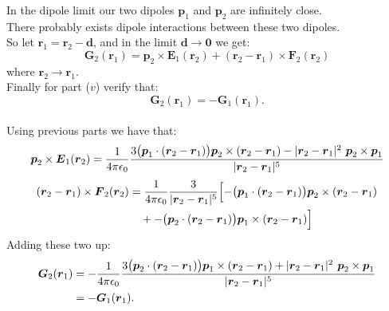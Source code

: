 \begin{enumerate}
    In the dipole limit
    our two dipoles $\boldsymbol{p}_1$ and $\boldsymbol{p}_2$
    are infinitely close. \\
    There probably exists dipole interactions between these two dipoles. \\
    So let $\boldsymbol{r}_1=\boldsymbol{r}_2-\boldsymbol{d}$,
    and in the limit $\boldsymbol{d}\rightarrow\boldsymbol{0}$ we get:
    $$\boldsymbol{G}_2(\boldsymbol{r}_1)
    =\boldsymbol{p}_2\times\boldsymbol{E}_1(\boldsymbol{r}_2)
    +(\boldsymbol{r}_2-\boldsymbol{r}_1)
    \times\boldsymbol{F}_2(\boldsymbol{r}_2)$$
    where $\boldsymbol{r}_2\rightarrow\boldsymbol{r}_1$. \\

    Finally for part ($v$) verify that:
    $$\boldsymbol{G}_2(\boldsymbol{r}_1)
    =-\boldsymbol{G}_1(\boldsymbol{r}_1).$$ \\

    Using previous parts we have that:
    $$\boldsymbol{p}_2\times\boldsymbol{E}_1(\boldsymbol{r}_2)
    =\frac{1}{4\pi\epsilon_0}
    \frac{3\bigl(\boldsymbol{p}_1
    \cdot(\boldsymbol{r}_2-\boldsymbol{r}_1)\bigr)
    \boldsymbol{p}_2\times
    (\boldsymbol{r}_2-\boldsymbol{r}_1)
    -|\boldsymbol{r}_2-\boldsymbol{r}_1|^2
    \hspace{0.05in}\boldsymbol{p}_2\times\boldsymbol{p}_1}
    {|\boldsymbol{r}_2-\boldsymbol{r}_1|^5}$$
    \begin{align*}
        (\boldsymbol{r}_2-\boldsymbol{r}_1)
        \times\boldsymbol{F}_2(\boldsymbol{r}_2)
        &=\frac{1}{4\pi\epsilon_0}
        \frac{3}{|\boldsymbol{r}_2-\boldsymbol{r}_1|^5}
        \Bigl[-\bigl(
        \boldsymbol{p}_1\cdot
        (\boldsymbol{r}_2-\boldsymbol{r}_1)\bigr)
        \boldsymbol{p}_2\times
        (\boldsymbol{r}_2-\boldsymbol{r}_1) \\
        &\quad+-
        \bigl(\boldsymbol{p}_2\cdot
        (\boldsymbol{r}_2-\boldsymbol{r}_1)\bigr)
        \boldsymbol{p}_1\times
        (\boldsymbol{r}_2-\boldsymbol{r}_1)
        \Bigr]
    \end{align*}
    Adding these two up:
    \begin{align*}
        \boldsymbol{G}_2(\boldsymbol{r}_1)
        &=-\frac{1}{4\pi\epsilon_0}
        \frac{3\bigl(\boldsymbol{p}_2
        \cdot(\boldsymbol{r}_2-\boldsymbol{r}_1)\bigr)
        \boldsymbol{p}_1\times
        (\boldsymbol{r}_2-\boldsymbol{r}_1)
        +|\boldsymbol{r}_2-\boldsymbol{r}_1|^2
        \hspace{0.05in}\boldsymbol{p}_2\times\boldsymbol{p}_1}
        {|\boldsymbol{r}_2-\boldsymbol{r}_1|^5} \\
        &=-\boldsymbol{G}_1(\boldsymbol{r}_1).
    \end{align*}


\end{enumerate}
